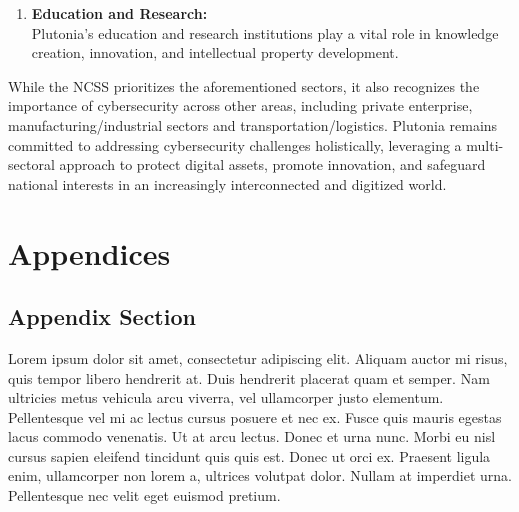\documentclass[
	a4paper, %
	10pt, %
]{CSSullivanBusinessReport}
\begin{document}
\begin{fullwidth}
\begin{justify}
\begin{enumerate}
	\item \textbf{Education and Research:} \\Plutonia's education and research institutions play a vital role in knowledge creation, innovation, and intellectual property development.
\end{enumerate}
While the NCSS prioritizes the aforementioned sectors, it also recognizes the importance of cybersecurity across other areas, including private enterprise, manufacturing/industrial sectors and transportation/logistics. Plutonia remains committed to addressing cybersecurity challenges holistically, leveraging a multi-sectoral approach to protect digital assets, promote innovation, and safeguard national interests in an increasingly interconnected and digitized world.



\newpage


\begin{twothirdswidth} %
	\printbibliography[title=Reference List] %
\end{twothirdswidth}


\newpage

\section*{Appendices}

\begin{appendices}

\section{Appendix Section}

Lorem ipsum dolor sit amet, consectetur adipiscing elit. Aliquam auctor mi risus, quis tempor libero hendrerit at. Duis hendrerit placerat quam et semper. Nam ultricies metus vehicula arcu viverra, vel ullamcorper justo elementum. Pellentesque vel mi ac lectus cursus posuere et nec ex. Fusce quis mauris egestas lacus commodo venenatis. Ut at arcu lectus. Donec et urna nunc. Morbi eu nisl cursus sapien eleifend tincidunt quis quis est. Donec ut orci ex. Praesent ligula enim, ullamcorper non lorem a, ultrices volutpat dolor. Nullam at imperdiet urna. Pellentesque nec velit eget euismod pretium.


\end{appendices}
\end{justify}
\end{fullwidth}
\end{document}
